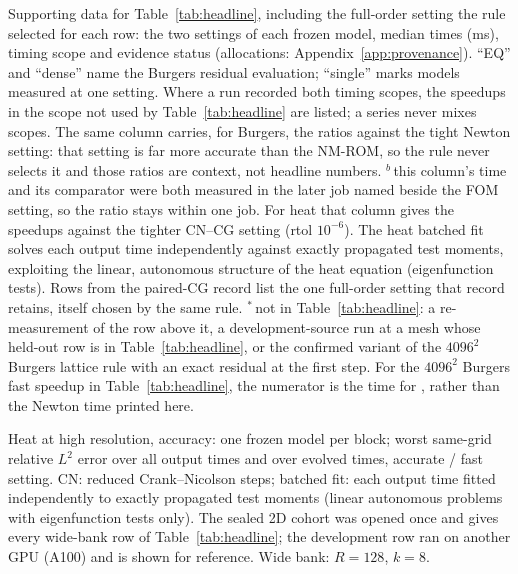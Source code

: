 \begin{table}[htbp]
\centering
\caption{Supporting data for Table~\ref{tab:headline}, including the full-order setting the rule selected for each row: the two settings
of each frozen model, median times (ms), timing scope and evidence status
(allocations: Appendix~\ref{app:provenance}). ``EQ'' and ``dense'' name the Burgers residual
evaluation; ``single'' marks models measured at one setting. Where a
run recorded both timing scopes, the speedups in the scope not used by
Table~\ref{tab:headline} are listed; a series never mixes scopes. The
same column carries, for Burgers, the ratios against the tight Newton
setting: that setting is far more accurate than the NM-ROM, so the rule
never selects it and those ratios are context, not headline numbers.
$^{b}$\,this column's time and its comparator were both measured in the
later job named beside the FOM setting, so the ratio stays within one
job.
For heat that column gives the speedups against the tighter
CN--CG setting (rtol $10^{-6}$). The heat batched fit solves each output time independently against
exactly propagated test moments, exploiting the linear, autonomous
structure of the heat equation (eigenfunction tests). Rows from the
paired-CG record list the one full-order setting that record retains,
itself chosen by the same rule.
$^{\ast}$\,not in Table~\ref{tab:headline}: a re-measurement of the row
above it, a development-source run at a mesh whose held-out row is in
Table~\ref{tab:headline}, or the confirmed variant of the
$4096^2$ Burgers lattice rule with an exact residual at the first step.
For the $4096^2$ Burgers fast speedup in Table~\ref{tab:headline}, the
numerator is the time for \nBhFastFom{}, rather than the Newton time
printed here.}
\label{tab:headline-times}
\resizebox{\linewidth}{!}{}
\end{table}

\begin{table}[htbp]
\centering
\caption{Heat at high resolution, accuracy: one frozen model per block;
worst same-grid relative $L^2$ error over all output times and over
evolved times, accurate / fast setting. CN: reduced Crank--Nicolson
steps; batched fit: each output time fitted independently to exactly
propagated test moments (linear autonomous problems with eigenfunction
tests only). The sealed 2D cohort was opened once and gives every
wide-bank row of Table~\ref{tab:headline}; the development row ran on
another GPU (A100) and is shown for reference. Wide bank: $R=128$, $k=8$.}
\label{tab:heat-hires}
\resizebox{\linewidth}{!}{}
\end{table}


